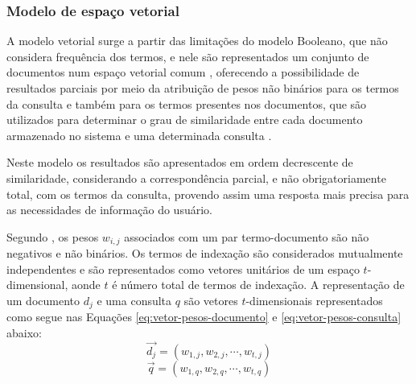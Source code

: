 \subsubsection{Modelo de espaço vetorial} \label{subsubsec:Modelo-espaço-vetorial}



    A modelo vetorial surge a partir das limitações do modelo Booleano, que não considera frequência dos termos, e nele são representados um conjunto de documentos num espaço vetorial comum \cite[p.~110]{Manning2008IIR}, oferecendo a possibilidade de resultados parciais por meio da atribuição de pesos não binários para os termos da consulta e também para os termos presentes nos documentos, que são utilizados para determinar o grau de similaridade entre cada documento armazenado no sistema e uma determinada consulta \cite[p.~77]{Baeza-Yates2011}.
    
    Neste modelo os resultados são apresentados em ordem decrescente de similaridade, considerando a correspondência parcial, e não obrigatoriamente total, com os termos da consulta, provendo assim uma resposta mais precisa para as necessidades de informação do usuário.
    
    Segundo , os pesos $w_{i,j}$ associados com um par termo-documento são não negativos e não binários.
    Os termos de indexação são considerados mutualmente independentes e são representados como vetores unitários de um espaço $t$-dimensional, aonde $t$ é número total de termos de indexação.
    A representação de um documento $d_j$ e uma consulta $q$ são vetores $t$-dimensionais representados como segue nas Equações \ref{eq:vetor-pesos-documento} e \ref{eq:vetor-pesos-consulta} abaixo:
    \begin{equation}
        \label{eq:vetor-pesos-documento}
		\vec{d_j} = (w_{1,j}, w_{2,j}, \cdots , w_{t,j})
    \end{equation}
    \begin{equation}
        \label{eq:vetor-pesos-consulta}
		\vec{q} = (w_{1,q}, w_{2,q}, \cdots , w_{t,q})
    \end{equation}
    
